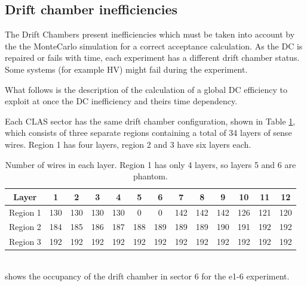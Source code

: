 \subsection{Drift chamber inefficiencies}
\label{sec:dc_ineff}
The Drift Chambers present inefficiencies which must be taken into account by the
the MonteCarlo simulation for a correct acceptance calculation.
As the DC is repaired or fails with time, each
experiment has a different drift chamber status. Some systems (for example HV) might 
fail during the experiment. 
 
What follows is the description of the calculation of a global DC efficiency
to exploit at once the DC
inefficiency and theirs time dependency.

Each CLAS sector has the same drift chamber configuration, shown in 
Table \ref{tab:layers}, which consists of three separate regions containing a 
total of 34 layers of sense wires. Region 1 has four layers, region 2 and 3 have
six layers each.  
\vspace{1cm}
\begin{table}[h]
 \begin{center}
  \begin{tabular}{| c | c c c c c c c c c c c c |}
   \hline
   Layer    & 1 & 2 & 3 & 4 & 5 & 6 & 7 & 8 & 9 & 10 & 11 & 12 \\
   \hline
   Region 1 & 130 & 130 & 130 & 130 &   0 &   0 & 142 & 142 & 142 & 126 & 121 & 120 \\
   Region 2 & 184 & 185 & 186 & 187 & 188 & 189 & 189 & 189 & 190 & 191 & 192 & 192 \\
   Region 3 & 192 & 192 & 192 & 192 & 192 & 192 & 192 & 192 & 192 & 192 & 192 & 192 \\
   \hline
  \end{tabular}  
  
  \caption[ Number of wires in each layer]
          { Number of wires in each layer. Region 1 has only 4 layers, so layers 5 and 6 are phantom.}
  \label{tab:layers}
 \end{center}
\end{table} \\
 shows the occupancy of the drift chamber in sector 6 for the e1-6 experiment.

